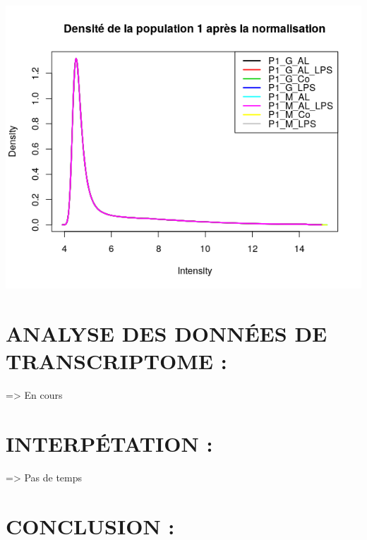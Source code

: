 \documentclass[a4paper,10pt]{article}
\begin{document}
\begin{center}
 \includegraphics[scale=0.5]{../../R/output/Densitypop1C.png}
\end{center}

\section{ANALYSE DES DONN\'{E}ES DE TRANSCRIPTOME :}
=> En cours
\section{INTERP\'{E}TATION :}
=> Pas de temps
\section{CONCLUSION :}
\nocite{smyth2005limma}
\nocite{druaghici2016statistics}
 

\end{document}
